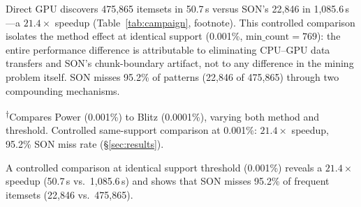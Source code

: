
Direct GPU discovers 475,865 itemsets in 50.7\,s versus SON's 22,846 in
1,085.6\,s---a $\mathbf{21.4\times}$ speedup (Table~\ref{tab:campaign},
footnote). This controlled comparison isolates the method effect at identical
support (0.001\%, $\text{min\_count}{=}769$): the entire performance
difference is attributable to eliminating CPU--GPU data transfers and SON's
chunk-boundary artifact, not to any difference in the mining problem itself.
SON misses 95.2\% of patterns (22,846 of 475,865) through two compounding
mechanisms.


\noindent\textsuperscript{$\dagger$}\footnotesize Compares Power (0.001\%) to
Blitz (0.0001\%), varying both method and threshold. Controlled same-support
comparison at 0.001\%: $21.4\times$ speedup, 95.2\% SON miss rate
(\S\ref{sec:results}).


A controlled comparison at identical support threshold (0.001\%) reveals a
$21.4\times$ speedup (50.7\,s vs.\ 1,085.6\,s) and shows that SON misses
95.2\% of frequent itemsets (22,846 vs.\ 475,865).


%

%
%

